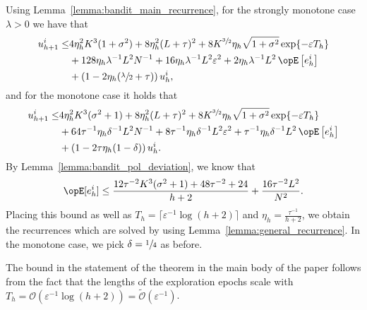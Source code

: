 Using Lemma~\ref{lemma:bandit_main_recurrence}, for the strongly monotone case $\lambda > 0$ we have that
\begin{align*}
    u_{h+1}^i \leq & 4 \eta_h^2 K^3(1 + \sigma^2) + 8\eta_h^2(L+\tau)^2 + 8 K^{\sfrac{3}{2}}\eta_h \sqrt{1+\sigma^2}  \exp\{-\varepsilon T_h\} \\
        &+128\eta_h\lambda^{-1} L^2 N^{-1} + 16\eta_h\lambda^{-1}L^2\varepsilon^2 + 2\eta_h\lambda^{-1} L^2 \Exop\left[e_h^i\right] \\
        &+\left(1 - 2 \eta_h(\sfrac{\lambda}{2} + \tau)\right) u_{h}^i,
\end{align*}
and for the monotone case it holds that 
\begin{align*}
    u_{h+1}^i \leq &  4\eta_h^2 K^3(\sigma^2 + 1) + 8 \eta_h^2 (L+\tau)^2 + 8 K^{\sfrac{3}{2}} \eta_h \sqrt{1+\sigma^2} \exp\{-\varepsilon T_h\} \\
    &+64\tau^{-1} \eta_h \delta^{-1}L^2 N^{-1}+8\tau^{-1} \eta_h \delta^{-1}L^2 \varepsilon^{2} + \tau^{-1} \eta_h\delta^{-1}L^2 \Exop\left[e_h^i\right] \\  
        &+ \left(1 - 2 \tau \eta_h (1-\delta)\right) u_{h}^i.
\end{align*}
By Lemma~\ref{lemma:bandit_pol_deviation}, we know that
\begin{align*}
    \Exop[e_h^i] \leq \frac{12\tau^{-2} K^3 (\sigma^2 + 1) + 48\tau^{-2} + 24}{h+2} + \frac{16\tau^{-2} L ^ 2}{N^2}.
\end{align*}
Placing this bound as well as $T_h = \lceil \varepsilon^{-1} \log (h+2) \rceil$ and $\eta_h = \frac{\tau^{-1}}{h+2}$, we obtain the recurrences which are solved by using Lemma~\ref{lemma:general_recurrence}.
In the monotone case, we pick $\delta=\sfrac{1}{4}$ as before.



The bound in the statement of the theorem in the main body of the paper follows from the fact that the lengths of the exploration epochs scale with $T_h = \mathcal{O}(\varepsilon^{-1} \log (h+2)) = \widetilde{\mathcal{O}}(\varepsilon^{-1})$.
